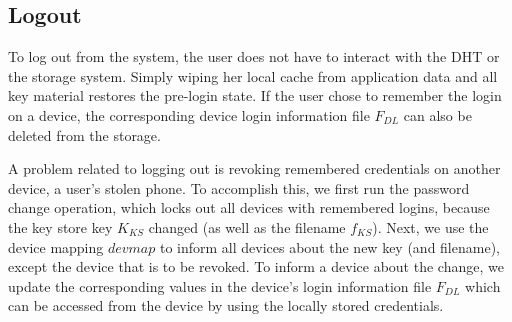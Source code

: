 % 
% 
% 


\subsection{Logout} 

To log out from the system, the user does not have to interact with the DHT or
the storage system.  Simply wiping her local cache from application data and
all key material restores the pre-login state.  If the user chose to
remember the login on a device, the corresponding device login information
file $F_{DL}$ can also be deleted from
the storage. %

A problem related to logging out is revoking remembered credentials on another
device, \eg a user's stolen phone.
To accomplish this, we first run the password change operation, which 
locks out all devices with remembered logins, because the key store key $K_{KS}$
changed (as well as the filename $f_{KS}$).
Next, we use the device mapping $devmap$ to inform all devices about the
new key (and filename), except the device that is to be revoked. To
inform a device about the change, we update the corresponding values in the device's
login information file $F_{DL}$ which can be accessed from the device by using
the locally stored credentials.

